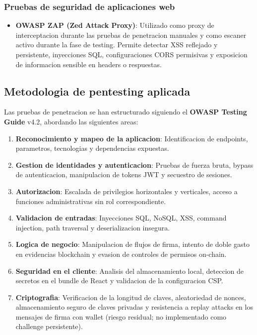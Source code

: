 \documentclass[11pt, a4paper]{article}
\begin{document}
\subsubsection{Pruebas de seguridad de aplicaciones web}

\begin{itemize}
    \item \textbf{OWASP ZAP (Zed Attack Proxy)}: Utilizado como proxy de interceptacion durante las pruebas de penetracion manuales y como escaner activo durante la fase de testing. Permite detectar XSS reflejado y persistente, inyecciones SQL, configuraciones CORS permisivas y exposicion de informacion sensible en headers o respuestas.
\end{itemize}

\subsection{Metodologia de pentesting aplicada}

Las pruebas de penetracion se han estructurado siguiendo el \textbf{OWASP Testing Guide} v4.2, abordando las siguientes areas:

\begin{enumerate}
    \item \textbf{Reconocimiento y mapeo de la aplicacion}: Identificacion de endpoints, parametros, tecnologias y dependencias expuestas.
    \item \textbf{Gestion de identidades y autenticacion}: Pruebas de fuerza bruta, bypass de autenticacion, manipulacion de tokens JWT y secuestro de sesiones.
    \item \textbf{Autorizacion}: Escalada de privilegios horizontales y verticales, acceso a funciones administrativas sin rol correspondiente.
    \item \textbf{Validacion de entradas}: Inyecciones SQL, NoSQL, XSS, command injection, path traversal y deserializacion insegura.
    \item \textbf{Logica de negocio}: Manipulacion de flujos de firma, intento de doble gasto en evidencias blockchain y evasion de controles de permisos on-chain.
    \item \textbf{Seguridad en el cliente}: Analisis del almacenamiento local, deteccion de secretos en el bundle de React y validacion de la configuracion CSP.
    \item \textbf{Criptografia}: Verificacion de la longitud de claves, aleatoriedad de nonces, almacenamiento seguro de claves privadas y resistencia a replay attacks en los mensajes de firma con wallet (riesgo residual; no implementado como challenge persistente).
\end{enumerate}
\end{document}
